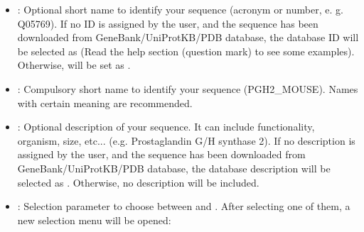 \begin{itemize}
  \begin{itemize}
  \item {}: Optional short name to identify your sequence (acronym or number, e. g. Q05769). If no ID is assigned by the user, and the sequence has been downloaded from GeneBank/UniProtKB/PDB database, the database ID will be selected as  (Read the help section (question mark) to see some examples). Otherwise,  will be set as .\\
  \item {}: Compulsory short name to identify your sequence (PGH2\_MOUSE). Names with certain meaning are recommended.\\
  \item {}: Optional description of your sequence. It can include functionality, organism, size, etc... (e.g. Prostaglandin G/H synthase 2). If no description is assigned by the user, and the sequence has been downloaded from GeneBank/UniProtKB/PDB database, the database description will be selected as . Otherwise, no description will be included.\\
  \item {}: Selection parameter to choose between  and . After selecting one of them, a new selection menu will be opened:\\
  

\end{itemize}
\end{itemize}
